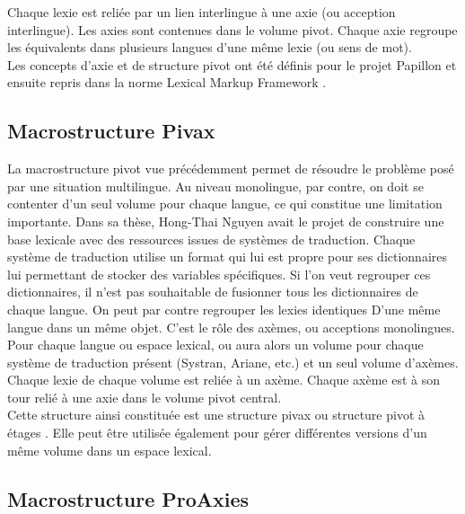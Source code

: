\documentclass[10pt,a4paper,twoside]{article}
\begin{document}
Chaque lexie est reliée par un lien interlingue à une axie (ou acception interlingue). Les axies sont contenues dans le volume pivot. Chaque axie regroupe les équivalents dans plusieurs langues d'une même lexie (ou sens de mot). \\
Les concepts d'axie et de structure pivot ont été définis pour le projet Papillon et ensuite repris dans la norme Lexical Markup Framework \cite{Francopoulo09}.


\subsection{Macrostructure Pivax}

La macrostructure pivot vue précédemment permet de résoudre le problème posé par une situation multilingue. Au niveau monolingue, par contre, on doit se contenter d'un seul volume pour chaque langue, ce qui constitue une limitation importante. Dans sa thèse, Hong-Thai Nguyen \cite{HTN09} avait le projet de construire une base lexicale avec des ressources issues de systèmes de traduction. Chaque système de traduction utilise un format qui lui est propre pour ses dictionnaires lui permettant de stocker des variables spécifiques. Si l'on veut regrouper ces dictionnaires, il n'est pas souhaitable de fusionner tous les dictionnaires de chaque langue. On peut par contre regrouper les lexies identiques D'une même langue dans un même objet. C'est le rôle des axèmes, ou acceptions monolingues. \\

Pour chaque langue ou espace lexical, ou aura alors un volume pour chaque système de traduction présent (Systran, Ariane, etc.) et un seul volume d'axèmes. Chaque lexie de chaque volume est reliée à un axème. Chaque axème est à son tour relié à une axie dans le volume pivot central. \\
Cette structure ainsi constituée est une structure pivax ou structure pivot à étages \cite{MMHTN09}. Elle peut être utilisée également pour gérer différentes versions d'un même volume dans un espace lexical.

\subsection{Macrostructure ProAxies}
\end{document}
